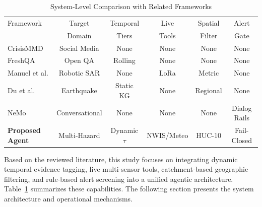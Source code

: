 \documentclass[conference]{IEEEtran}
\begin{document}
\begin{table}[ht]
\caption{System-Level Comparison with Related Frameworks}
\label{tab:lit}
\centering
\scriptsize
\setlength{\tabcolsep}{1.5pt}
\begin{tabular*}{\columnwidth}{@{\extracolsep{\fill}}lccccc@{}}
\toprule
Framework & Target & Temporal & Live & Spatial & Alert \\
          & Domain & Tiers & Tools & Filter & Gate \\
\midrule
CrisisMMD \cite{crisismmd} & Social Media & None & None & None & None \\
FreshQA \cite{freshqa} & Open QA & Rolling & None & None & None \\
Manuel et al. \cite{manuel2024} & Robotic SAR & None & LoRa & Metric & None \\
Du et al. \cite{zhang2024} & Earthquake & Static KG & None & Regional & None \\
NeMo \cite{nemoguardrails} & Conversational & None & None & None & Dialog Rails \\
\midrule
\textbf{Proposed Agent} & Multi-Hazard & Dynamic $\tau$ & NWIS/Meteo & HUC-10 & Fail-Closed \\
\bottomrule
\end{tabular*}
\end{table}

Based on the reviewed literature, this study focuses on integrating dynamic temporal evidence tagging, live multi-sensor tools, catchment-based geographic filtering, and rule-based alert screening into a unified agentic architecture. Table~\ref{tab:lit} summarizes these capabilities. The following section presents the system architecture and operational mechanisms.
\end{document}
